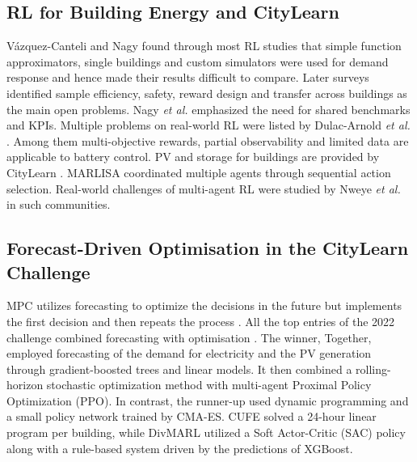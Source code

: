 \documentclass[conference]{IEEEtran}
\begin{document}
\subsection{RL for Building Energy and CityLearn}
V\'azquez-Canteli and Nagy \cite{vazquez2019review} found through most RL studies that simple function approximators,
single buildings and custom simulators were used for demand response and hence made their results difficult to compare.
Later surveys \cite{wang2020rlbuildings,yu2021review} identified sample efficiency, safety, reward design and transfer
across buildings as the main open problems. Nagy \emph{et al.} \cite{nagy2023tenquestions} emphasized the need for shared
benchmarks and KPIs. Multiple problems on real-world RL were listed by Dulac-Arnold \emph{et al.}
\cite{dulacarnold2021challenges}. Among them multi-objective rewards, partial observability and limited data are
applicable to battery control. PV and storage for buildings are provided by CityLearn
\cite{vazquez2019citylearn,nweye2024citylearn}. MARLISA \cite{vazquez2020marlisa} coordinated multiple agents through
sequential action selection. Real-world challenges of multi-agent RL were studied by Nweye \emph{et al.}
\cite{nweye2022realworld} in such communities.

\subsection{Forecast-Driven Optimisation in the CityLearn Challenge}
MPC utilizes forecasting to optimize the decisions in the future but implements the first decision and then repeats the
process \cite{rawlings2017mpc}. All the top entries of the 2022 challenge combined forecasting with optimisation
\cite{nweye2023challenge}. The winner, Together, employed forecasting of the demand for electricity and the PV generation
through gradient-boosted trees and linear models. It then combined a rolling-horizon stochastic optimization method with
multi-agent Proximal Policy Optimization (PPO). In contrast, the runner-up used dynamic programming and a small policy
network trained by CMA-ES. CUFE solved a 24-hour linear program per building, while DivMARL utilized a Soft Actor-Critic
(SAC) policy along with a rule-based system driven by the predictions of XGBoost.
\end{document}
